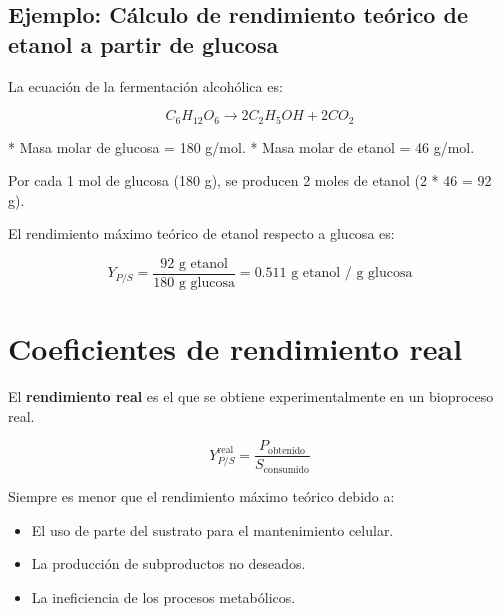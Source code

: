 \subsection*{Ejemplo: Cálculo de rendimiento teórico de etanol a partir de glucosa}

La ecuación de la fermentación alcohólica es:

\[
C_6H_{12}O_6 \rightarrow 2 C_2H_5OH + 2 CO_2
\]

*   Masa molar de glucosa = 180 g/mol.
*   Masa molar de etanol = 46 g/mol.

Por cada 1 mol de glucosa (180 g), se producen 2 moles de etanol (2 * 46 = 92 g).

El rendimiento máximo teórico de etanol respecto a glucosa es:

\[
Y_{P/S} = \frac{92 \text{ g etanol}}{180 \text{ g glucosa}} = 0.511 \text{ g etanol / g glucosa}
\]

\section{Coeficientes de rendimiento real}

El \textbf{rendimiento real} es el que se obtiene experimentalmente en un bioproceso real.

\[
Y_{P/S}^{\text{real}} = \frac{P_{\text{obtenido}}}{S_{\text{consumido}}}
\]

Siempre es menor que el rendimiento máximo teórico debido a:
\begin{itemize}
    \item El uso de parte del sustrato para el mantenimiento celular.
    \item La producción de subproductos no deseados.
    \item La ineficiencia de los procesos metabólicos.
\end{itemize}
